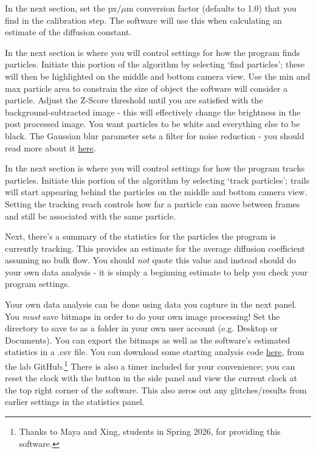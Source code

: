 \documentclass{../lab}
\begin{document}
In the next section, set the px/$\mu$m conversion factor (defaults to 1.0) that you find in the calibration step. The software will use this when calculating an estimate of the diffusion constant.

In the next section is where you will control settings for how the program finds particles. Initiate this portion of the algorithm by selecting `find particles'; these will then be highlighted on the middle and bottom camera view. Use the min and max particle area to constrain the size of object the software will consider a particle. Adjust the Z-Score threshold until you are satisfied with the background-subtracted image - this will effectively change the brightness in the post processed image. You want particles to be white and everything else to be black. The Gaussian blur parameter sets a filter for noise reduction - you should read more about it \href{https://docs.opencv.org/4.13.0/d4/d13/tutorial_py_filtering.html}{here}.

In the next section is where you will control settings for how the program tracks particles. Initiate this portion of the algorithm by selecting `track particles'; trails will start appearing behind the particles on the middle and bottom camera view. Setting the tracking reach controls how far a particle can move between frames and still be associated with the same particle.

Next, there's a summary of the statistics for the particles the program is currently tracking. This provides an estimate for the average diffusion coefficient assuming no bulk flow. You should \textit{not} quote this value and instead should do your own data analysis - it is simply a beginning estimate to help you check your program settings.

Your own data analysis can be done using data you capture in the next panel. You \textit{must} save bitmaps in order to do your own image processing! Set the directory to save to as a folder in your own user account (e.g. Desktop or Documents). You can export the bitmaps as well as the software's estimated statistics in a .csv file. You can download some starting analysis code \href{https://github.com/berkeley-physics111b/BMC/blob/main/BMC%20Python%20Package.zip}{here}, from the lab GitHub.\footnote{Thanks to Maya and Xing, students in Spring 2026, for providing this software.} There is also a timer included for your convenience; you can reset the clock with the button in the side panel and view the current clock at the top right corner of the software. This also zeros out any glitches/results from earlier settings in the statistics panel.
\end{document}
